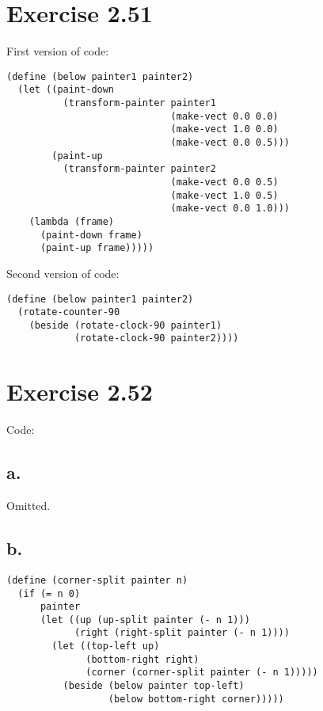 \documentclass[../main.tex]{subfiles}
\begin{document}
\section{Exercise 2.51}

First version of code:

\begin{lstlisting}
(define (below painter1 painter2)
  (let ((paint-down
          (transform-painter painter1
                             (make-vect 0.0 0.0)
                             (make-vect 1.0 0.0)
                             (make-vect 0.0 0.5)))
        (paint-up
          (transform-painter painter2
                             (make-vect 0.0 0.5)
                             (make-vect 1.0 0.5)
                             (make-vect 0.0 1.0)))
    (lambda (frame)
      (paint-down frame)
      (paint-up frame)))))
\end{lstlisting}

Second version of code:

\begin{lstlisting}
(define (below painter1 painter2)
  (rotate-counter-90
    (beside (rotate-clock-90 painter1)
            (rotate-clock-90 painter2))))
\end{lstlisting}

\section{Exercise 2.52}

Code:

\subsection{a.}

Omitted.

\subsection{b.}

\begin{lstlisting}
(define (corner-split painter n)
  (if (= n 0)
      painter
      (let ((up (up-split painter (- n 1)))
            (right (right-split painter (- n 1))))
        (let ((top-left up)
              (bottom-right right)
              (corner (corner-split painter (- n 1)))))
          (beside (below painter top-left)
                  (below bottom-right corner)))))
\end{lstlisting}
\end{document}
